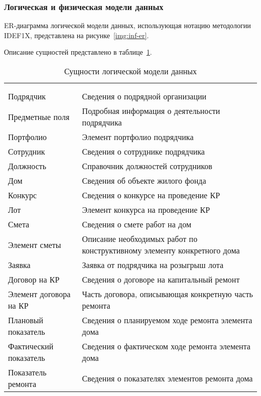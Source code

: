 \subsubsection{Логическая и физическая модели данных}

ER-диаграмма логической модели данных, использующая нотацию методологии IDEF1X, представлена на рисунке~\ref{img:inf-er}.


Описание сущностей представлено в таблице~\ref{tab:inf-entities}.

\begin{myTable}
\begin{longtable}[h]{|p{}|p{}|}
	\caption{\label{tab:inf-entities}Сущности логической модели данных} \\
	\hline
		\thead{Название сущности} &
		\thead{Описание} \\
	\hline
		\theadnum{1} & \theadnum{2} \\
	\hline \endfirsthead
	\hline
		\theadnum{1} & \theadnum{2} \\
	\hline \endhead
		Подрядчик & Сведения о подрядной организации \\ \hline
		Предметные поля & Подробная информация о деятельности подрядчика \\ \hline
		Портфолио & Элемент портфолио подрядчика \\ \hline
		Сотрудник & Сведения о сотруднике подрядчика \\ \hline
		Должность & Справочник должностей сотрудников \\ \hline
		Дом & Сведения об объекте жилого фонда \\ \hline
		Конкурс & Сведения о конкурсе на проведение КР \\ \hline
		Лот & Элемент конкурса на проведение КР \\ \hline
		Смета & Сведения о смете работ на дом \\ \hline
		Элемент сметы & Описание необходимых работ по конструктивному элементу конкретного дома \\ \hline
		Заявка & Заявка от подрядчика на розыгрыш лота \\ \hline
		Договор на КР & Сведения о договоре на капитальный ремонт \\ \hline
		Элемент договора на КР & Часть договора, описывающая конкретную часть ремонта \\ \hline
		Плановый показатель & Сведения о планируемом ходе ремонта элемента дома \\ \hline
		Фактический показатель & Сведения о фактическом ходе ремонта элемента дома \\ \hline
		Показатель ремонта & Сведения о показателях элементов ремонта дома \\ \hline
\end{longtable}
\end{myTable}

